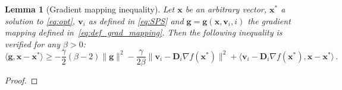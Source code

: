 \documentclass{article}
\newcommand{\blue}{\color{blue}}
\def\prox{{\mathbf{prox}}}
\def\xx{{\boldsymbol x}}
\def\vv{{\boldsymbol v}}
\def\zz{{\boldsymbol z}}
\def\DD{{\boldsymbol D}}
\newtheorem{lemma}{Lemma}
\begin{document}
\hfill


\begin{lemma}[Gradient mapping inequality]\label{lemma:gradient_mapping_1}
  Let $\xx$ be an arbitrary vector, $\xx^*$ a solution to \eqref{eq:opt},
  $\vv_i$ as defined in \eqref{eq:SPS} and $\boldsymbol g = \boldsymbol g(\xx, \vv_i, i)$ the gradient mapping defined in~\eqref{eq:def_grad_mapping}.  Then the following inequality is verified for any $\beta > 0$:
  \begin{equation}
  \langle \boldsymbol g, \xx - \xx^*\rangle\geq -\frac{\gamma}{2}(\beta - 2)\| \boldsymbol g\|^2 -  \frac{\gamma}{2\beta}\| \vv_i -  \DD_i \nabla f(\xx^*) \|^2 + \langle  \vv_i - \DD_i \nabla f(\xx^*) , \xx - \xx^*\rangle \,.
  \end{equation}
\end{lemma}
\begin{proof}


\end{proof}
\end{document}
